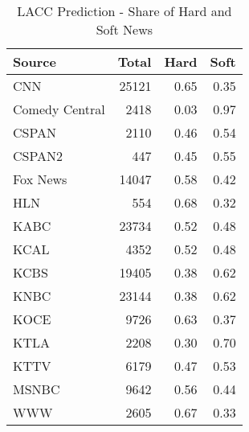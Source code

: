 \begin{table}[ht]
\centering
\caption{LACC Prediction - Share of Hard and Soft News} 
\label{tab:lacc_predict_hard_soft}
\begin{tabular}{lrrr}
  \hline
Source & Total & Hard & Soft \\ 
  \hline
CNN & 25121 & 0.65 & 0.35 \\ 
  Comedy Central & 2418 & 0.03 & 0.97 \\ 
  CSPAN & 2110 & 0.46 & 0.54 \\ 
  CSPAN2 & 447 & 0.45 & 0.55 \\ 
  Fox News & 14047 & 0.58 & 0.42 \\ 
  HLN & 554 & 0.68 & 0.32 \\ 
  KABC & 23734 & 0.52 & 0.48 \\ 
  KCAL & 4352 & 0.52 & 0.48 \\ 
  KCBS & 19405 & 0.38 & 0.62 \\ 
  KNBC & 23144 & 0.38 & 0.62 \\ 
  KOCE & 9726 & 0.63 & 0.37 \\ 
  KTLA & 2208 & 0.30 & 0.70 \\ 
  KTTV & 6179 & 0.47 & 0.53 \\ 
  MSNBC & 9642 & 0.56 & 0.44 \\ 
  WWW & 2605 & 0.67 & 0.33 \\ 
   \hline
\end{tabular}
\end{table}
